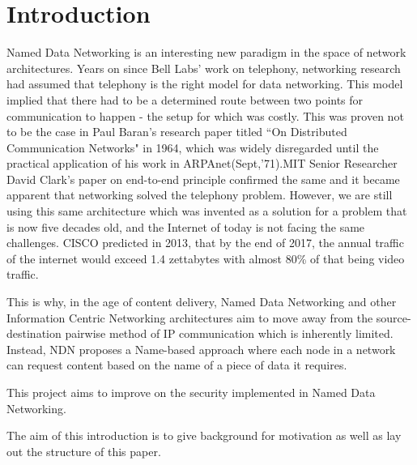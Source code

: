 \chapter{Introduction}
Named Data Networking is an interesting new paradigm in the space of network architectures. Years on since Bell Labs' work on telephony, networking research had assumed that telephony is the right model for data networking\cite{01}. This model implied that there had to be a determined route between two points for communication to happen - the setup for which was costly. This was proven not to be the case in Paul Baran's research paper titled ``On Distributed Communication Networks" in 1964, which was widely disregarded until the practical application of his work in ARPAnet(Sept,'71).MIT Senior Researcher David Clark's paper on end-to-end principle confirmed the same and it became apparent that networking solved the telephony problem. However, we are still using this same architecture which was invented as a solution for a problem that is now five decades old, and the Internet of today is not facing the same challenges. CISCO predicted in 2013\cite{02}\cite{03}, that by the end of 2017, the annual traffic of the internet would exceed 1.4 zettabytes with almost 80\% of that being video traffic.

This is why, in the age of content delivery, Named Data Networking and other Information Centric Networking architectures aim to move away from the source-destination pairwise method of IP communication which is inherently limited. Instead, NDN proposes a Name-based approach where each node in a network can request content based on the name of a piece of data it requires. 

This project aims to improve on the security implemented in Named Data Networking.


The aim of this introduction is to give background for motivation as well as lay out the structure of this paper.
